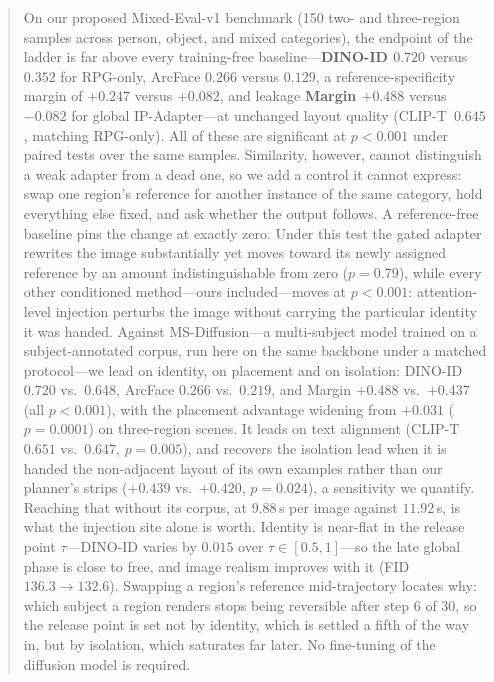 \documentclass[10pt,twocolumn,letterpaper]{article}
\begin{document}
\begin{abstract}
On our proposed Mixed-Eval-v1 benchmark (150 two- and three-region
samples across person, object, and mixed categories), the endpoint of the
ladder is far above every training-free baseline---\textbf{DINO-ID
$0.720$} versus $0.352$ for RPG-only, ArcFace $0.266$ versus $0.129$, a
reference-specificity margin of $+0.247$ versus $+0.082$, and leakage
\textbf{Margin $+0.488$} versus $-0.082$ for global IP-Adapter---at
unchanged layout quality (\mbox{CLIP-T $0.645$}, matching RPG-only).
All of these are significant at $p{<}0.001$ under paired tests over the
same samples.
Similarity, however, cannot distinguish a weak adapter from a dead one, so we
add a control it cannot express: swap one region's reference for another
instance of the same category, hold everything else fixed, and ask whether the
output follows.  A reference-free baseline pins the change at exactly zero.
Under this test the gated adapter rewrites the image substantially yet moves
toward its newly assigned reference by an amount indistinguishable from zero
($p{=}0.79$), while every other conditioned method---ours included---moves at
$p{<}0.001$: attention-level injection perturbs the image without carrying the
particular identity it was handed.
Against MS-Diffusion---a multi-subject model trained on a
subject-annotated corpus, run here on the same backbone under a matched
protocol---we lead on identity, on placement and on isolation: DINO-ID
$0.720$ vs.\ $0.648$, ArcFace $0.266$ vs.\ $0.219$, and Margin $+0.488$ vs.\
$+0.437$ (all $p{<}0.001$), with the placement advantage widening from
$+0.031$ ($p{=}0.0001$) on three-region scenes.  It leads on text alignment
(CLIP-T $0.651$ vs.\ $0.647$, $p{=}0.005$), and recovers the isolation lead
when it is handed the non-adjacent layout of its own examples rather than our
planner's strips ($+0.439$ vs.\ $+0.420$, $p{=}0.024$), a sensitivity we
quantify.  Reaching that without its corpus, at $9.88$\,s per image against
$11.92$\,s, is what the injection site alone is worth.
Identity is near-flat in the release point $\tau$---DINO-ID varies by
$0.015$ over $\tau\in[0.5,1]$---so the late global phase is close to
free, and image realism improves with it (FID $136.3\!\to\!132.6$).
Swapping a region's reference mid-trajectory locates why: which subject a
region renders stops being reversible after step 6 of 30, so the release point
is set not by identity, which is settled a fifth of the way in, but by
isolation, which saturates far later.
No fine-tuning of the diffusion model is required.
\end{abstract}
\end{document}
